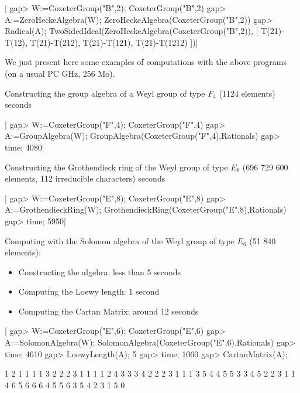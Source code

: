 |    gap> W:=CoxeterGroup("B",2);
    CoxeterGroup("B",2)
    gap> A:=ZeroHeckeAlgebra(W);
    ZeroHeckeAlgebra(CoxeterGroup("B",2))
    gap> Radical(A);
    TwoSidedIdeal(ZeroHeckeAlgebra(CoxeterGroup("B",2)),
    [ T(21)-T(12), T(21)-T(212), T(21)-T(121), T(21)-T(1212) ])|

We  just present here some examples of computations with the above programs
(on a usual PC GHz, 256 Mo).

Constructing  the  group  algebra  of  a  Weyl  group  of  type $F_4$ (1124
elements) seconds

|    gap> W:=CoxeterGroup("F",4);
    CoxeterGroup("F",4)
    gap> A:=GroupAlgebra(W);
    GroupAlgebra(CoxeterGroup("F",4),Rationals)
    gap> time;
    4080|

Constructing the Grothendieck ring of the Weyl group of type $E_8$ (696 729
600 elements, 112 irreducible characters) seconds

|    gap> W:=CoxeterGroup("E",8);
    CoxeterGroup("E",8)
    gap> A:=GrothendieckRing(W);
    GrothendieckRing(CoxeterGroup("E",8),Rationals)
    gap> time;
    5950|

Computing with the Solomon algebra of the Weyl group of type $E_6$
(51 840 elements):

\begin{itemize}
\item Constructing the algebra: less than 5 seconds
\item Computing the Loewy length: 1 second
\item Computing the Cartan Matrix: around 12 seconds
\end{itemize}

|    gap> W:=CoxeterGroup("E",6);
    CoxeterGroup("E",6)
    gap> A:=SolomonAlgebra(W);
    SolomonAlgebra(CoxeterGroup("E",6),Rationals)
    gap> time;
    4610
    gap> LoewyLength(A);
    5
    gap> time;
    1060
    gap> CartanMatrix(A);

             1
             2  1  1  1  1
             3  2  2  2  3  1  1  1  1                    2
             4  3  3  3  4  2  2  2  3  1  1  1           3
             5  4  4  5  5  3  3  4  5  2  2  3  1  1     4
             6  5  6  6  6  4  5  5  6  3  5  4  2  3  1  5  0

